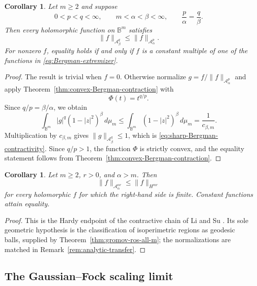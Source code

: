\documentclass[11pt,reqno]{amsart}
\numberwithin{equation}{section}
\newtheorem{corollary}[theorem]{Corollary}
\theoremstyle{definition}
\theoremstyle{remark}
\begin{document}
\begin{corollary}
\label{cor:sharp-Bergman-contractivity}
Let $m\ge2$ and suppose
\[
 0<p<q<\infty,
 \qquad
 m<\alpha<\beta<\infty,
 \qquad
 \frac{p}{\alpha}=\frac{q}{\beta}.
\]
Then every holomorphic function on $\mathbb B^m$ satisfies
\begin{equation}
 \|f\|_{\mathcal A^q_\beta}
 \le
 \|f\|_{\mathcal A^p_\alpha}.
 \label{eq:sharp-Bergman-contractivity}
\end{equation}
For nonzero $f$, equality holds if and only if $f$ is a constant multiple of
one of the functions in \eqref{eq:Bergman-extremizer}.
\end{corollary}

\begin{proof}
The result is trivial when $f=0$.  Otherwise normalize
$g=f/\|f\|_{\mathcal A^p_\alpha}$ and apply
Theorem~\ref{thm:convex-Bergman-contraction} with
\[
 \Phi(t)=t^{q/p}.
\]
Since $q/p=\beta/\alpha$, we obtain
\[
 \int_{\mathbb B^m}|g|^q(1-|z|^2)^\beta\,d\mu_m
 \le
 \int_{\mathbb B^m}(1-|z|^2)^\beta\,d\mu_m
 =\frac{1}{c_{\beta,m}}.
\]
Multiplication by $c_{\beta,m}$ gives
$\|g\|_{\mathcal A^q_\beta}\le1$, which is
\eqref{eq:sharp-Bergman-contractivity}.  Since $q/p>1$, the function
$\Phi$ is strictly convex, and the equality statement follows from
Theorem~\ref{thm:convex-Bergman-contraction}.
\end{proof}

\begin{corollary}
\label{cor:Hardy-Bergman-contractivity}
Let $m\ge2$, $r>0$, and $\alpha>m$.  Then
\[
 \|f\|_{\mathcal A^{\alpha r}_\alpha}
 \le
 \|f\|_{H^{mr}}
\]
for every holomorphic $f$ for which the right-hand side is finite.  Constant
functions attain equality.
\end{corollary}

\begin{proof}
This is the Hardy endpoint of the contractive chain of Li and Su
\cite[Corollary~1.8]{LiSu2025}. Its sole geometric hypothesis is the
classification of isoperimetric regions as geodesic balls, supplied by
Theorem~\ref{thm:gromov-ros-all-m}; the normalizations are matched in
Remark~\ref{rem:analytic-transfer}.
\end{proof}

\subsection{The Gaussian--Fock scaling limit}
\end{document}
